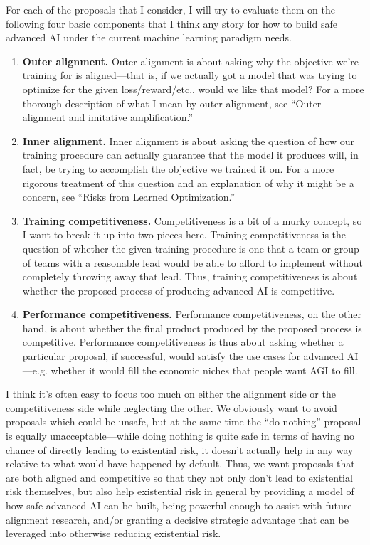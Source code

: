 For each of the proposals that I consider, I will try to evaluate them on the following four basic components that I think any story for how to build safe advanced AI under the current machine learning paradigm needs.

\begin{enumerate}
\item \textbf{Outer alignment.} Outer alignment is about asking why the objective we're training for is aligned---that is, if we actually got a model that was trying to optimize for the given loss/reward/etc., would we like that model? For a more thorough description of what I mean by outer alignment, see ``Outer alignment and imitative amplification\cite{TODO: cite https://www.alignmentforum.org/posts/33EKjmAdKFn3pbKPJ/outer-alignment-and-imitative-amplification}.''
\item \textbf{Inner alignment.} Inner alignment is about asking the question of how our training procedure can actually guarantee that the model it produces will, in fact, be trying to accomplish the objective we trained it on. For a more rigorous treatment of this question and an explanation of why it might be a concern, see ``Risks from Learned Optimization\cite{TODO: cite https://arxiv.org/abs/1906.01820}.''
\item \textbf{Training competitiveness.} Competitiveness is a bit of a murky concept, so I want to break it up into two pieces here. Training competitiveness is the question of whether the given training procedure is one that a team or group of teams with a reasonable lead would be able to afford to implement without completely throwing away that lead. Thus, training competitiveness is about whether the proposed process of producing advanced AI is competitive.
\item \textbf{Performance competitiveness.} Performance competitiveness, on the other hand, is about whether the final product produced by the proposed process is competitive. Performance competitiveness is thus about asking whether a particular proposal, if successful, would satisfy the use cases for advanced AI---e.g. whether it would fill the economic niches that people want AGI to fill.
\end{enumerate}

I think it's often easy to focus too much on either the alignment side or the competitiveness side while neglecting the other. We obviously want to avoid proposals which could be unsafe, but at the same time the ``do nothing'' proposal is equally unacceptable---while doing nothing is quite safe in terms of having no chance of directly leading to existential risk, it doesn't actually help in any way relative to what would have happened by default. Thus, we want proposals that are both aligned and competitive so that they not only don't lead to existential risk themselves, but also help existential risk in general by providing a model of how safe advanced AI can be built, being powerful enough to assist with future alignment research, and/or granting a decisive strategic advantage\cite{TODO: cite https://www.lesswrong.com/posts/vkjWGJrFWBnzHtxrw/superintelligence-7-decisive-strategic-advantage} that can be leveraged into otherwise reducing existential risk.

